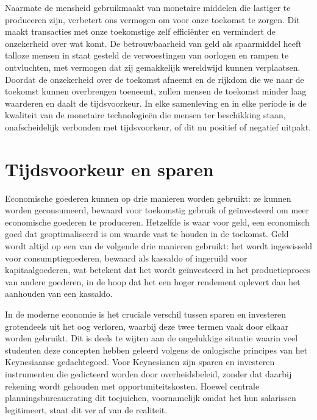 Naarmate de mensheid gebruikmaakt van monetaire middelen die lastiger te produceren zijn, verbetert ons vermogen om voor onze toekomst te zorgen. Dit maakt transacties met onze toekomstige zelf efficiënter en vermindert de onzekerheid over wat komt. De betrouwbaarheid van geld als spaarmiddel heeft talloze mensen in staat gesteld de verwoestingen van oorlogen en rampen te ontvluchten, met vermogen dat zij gemakkelijk wereldwijd kunnen verplaatsen. Doordat de onzekerheid over de toekomst afneemt en de rijkdom die we naar de toekomst kunnen overbrengen toeneemt, zullen mensen de toekomst minder laag waarderen en daalt de tijdsvoorkeur. In elke samenleving en in elke periode is de kwaliteit van de monetaire technologieën die mensen ter beschikking staan, onafscheidelijk verbonden met tijdsvoorkeur, of dit nu positief of negatief uitpakt.

\hypertarget{tijdsvoorkeur-en-sparen}{%
\section{Tijdsvoorkeur en sparen}\label{tijdsvoorkeur-en-sparen}}

Economische goederen kunnen op drie manieren worden gebruikt: ze kunnen worden geconsumeerd, bewaard voor toekomstig gebruik of geïnvesteerd om meer economische goederen te produceren. Hetzelfde is waar voor geld, een economisch goed dat geoptimaliseerd is om waarde vast te houden in de toekomst. Geld wordt altijd op een van de volgende drie manieren gebruikt: het wordt ingewisseld voor consumptiegoederen, bewaard als kassaldo of ingeruild voor kapitaalgoederen, wat betekent dat het wordt geïnvesteerd in het productieproces van andere goederen, in de hoop dat het een hoger rendement oplevert dan het aanhouden van een kassaldo.

In de moderne economie is het cruciale verschil tussen sparen en investeren grotendeels uit het oog verloren, waarbij deze twee termen vaak door elkaar worden gebruikt. Dit is deels te wijten aan de ongelukkige situatie waarin veel studenten deze concepten hebben geleerd volgens de onlogische principes van het Keynesiaanse gedachtegoed. Voor Keynesianen zijn sparen en investeren instrumenten die gedicteerd worden door overheidsbeleid, zonder dat daarbij rekening wordt gehouden met opportuniteitskosten. Hoewel centrale planningsbureaucrating dit toejuichen, voornamelijk omdat het hun salarissen legitimeert, staat dit ver af van de realiteit.

